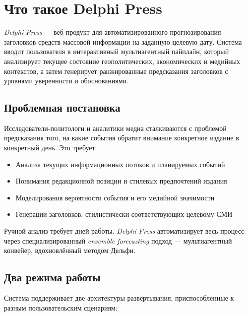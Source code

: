 
\section{Что такое Delphi Press}

\label{sec:overview}


\emph{Delphi Press} — веб-продукт для автоматизированного прогнозирования заголовков средств массовой информации на заданную целевую дату. Система вводит пользователя в интерактивный мультиагентный пайплайн, который анализирует текущее состояние геополитических, экономических и медийных контекстов, а затем генерирует ранжированные предсказания заголовков с уровнями уверенности и обоснованиями.

\subsection{Проблемная постановка}

Исследователи-политологи и аналитики медиа сталкиваются с проблемой предсказания того, на какие события обратит внимание конкретное издание в конкретный день. Это требует:

\begin{itemize}[nosep]
\item Анализа текущих информационных потоков и планируемых событий
\item Понимания редакционной позиции и стилевых предпочтений издания
\item Моделирования вероятности события и его медийной значимости
\item Генерации заголовков, стилистически соответствующих целевому СМИ
\end{itemize}

Ручной анализ требует дней работы. \emph{Delphi Press} автоматизирует весь процесс через специализированный \emph{ensemble forecasting} подход — мультиагентный конвейер, вдохновлённый методом Дельфи.

\subsection{Два режима работы}

Система поддерживает две архитектуры развёртывания, приспособленные к разным пользовательским сценариям:

